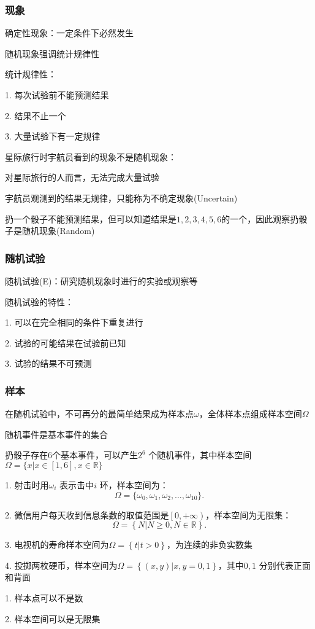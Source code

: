 \subsubsection{现象}%
\label{subsub:现象}
确定性现象：一定条件下必然发生

随机现象强调统计规律性

\begin{notation}
统计规律性：

1. 每次试验前不能预测结果

2. 结果不止一个

3. 大量试验下有一定规律
\end{notation}
\begin{eg}
    星际旅行时宇航员看到的现象不是随机现象：

    对星际旅行的人而言，无法完成大量试验

    宇航员观测到的结果无规律，只能称为不确定现象(Uncertain)
\end{eg}
\begin{eg}
    扔一个骰子不能预测结果，但可以知道结果是$1,2,3,4,5,6$的一个，因此观察扔骰子是随机现象(Random)
\end{eg}
\subsubsection{随机试验}%
\label{subsub:随机试验}
随机试验(E)：研究随机现象时进行的实验或观察等

\begin{notation}
    随机试验的特性：

    1. 可以在完全相同的条件下重复进行

    2. 试验的可能结果在试验前已知

    3. 试验的结果不可预测
\end{notation}
\subsubsection{样本}%
\label{subsub:样本}
在随机试验中，不可再分的最简单结果成为样本点$\omega$，全体样本点组成样本空间$\Omega$
\begin{notation}
    随机事件是基本事件的集合
\end{notation}
\begin{eg}
    扔骰子存在6个基本事件，可以产生$2^6$ 个随机事件，其中样本空间$\Omega=\{x|x\in \left[ 1,6 \right] ,x\in \mathbb{R}\}$
\end{eg}
\begin{eg}
    1. 射击时用$\omega_i$ 表示击中$i$ 环，样本空间为：\[
        \Omega=\{\omega_0,\omega_1,\omega_2,\ldots,\omega_{10}\}
    .\]

    2. 微信用户每天收到信息条数的取值范围是$\left[ 0,+\infty \right) $，样本空间为无限集：\[
        \Omega=\left\{ N|N\ge 0 ,N\in \mathbb{R}\right\} 
    .\] 

    3. 电视机的寿命样本空间为$\Omega=\left\{ t|t>0 \right\} $，为连续的非负实数集

    4. 投掷两枚硬币，样本空间为$\Omega=\left\{ \left( x,y \right) |x,y=0,1 \right\} $，其中$0,1$ 分别代表正面和背面
\end{eg}
\begin{notation}
    1. 样本点可以不是数

    2. 样本空间可以是无限集
\end{notation}
